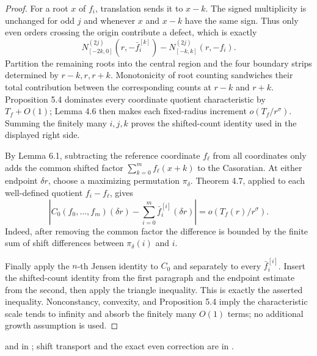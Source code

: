 \begin{proof}
\leanok
For a root $x$ of $f_i$, translation sends it to $x-k$.  The signed
multiplicity is unchanged for odd $j$ and whenever $x$ and $x-k$ have the
same sign.  Thus only even orders crossing the origin contribute a defect,
which is exactly
\[
 N_{[-2k,0]}^{(2j)}(r,-\bar f_i^{[k]})
 -N_{[-k,k]}^{(2j)}(r,-f_i).
\]
Partition the remaining roots into the central region and the four boundary
strips determined by $r-k,r,r+k$.  Monotonicity of root counting sandwiches
their total contribution between the corresponding counts at $r-k$ and
$r+k$.  Proposition 5.4 dominates every coordinate quotient characteristic
by $T_f+O(1)$; Lemma 4.6 then makes each fixed-radius increment
$o(T_f/r^\sigma)$.  Summing the finitely many $i,j,k$ proves the shifted-count
identity used in the displayed right side.

By Lemma 6.1, subtracting the reference coordinate $f_\ell$ from all
coordinates only adds the common shifted factor
$\sum_{k=0}^m f_\ell(x+k)$ to the Casoratian.  At either endpoint $\delta r$,
choose a maximizing permutation $\pi_\delta$.  Theorem 4.7, applied to each
well-defined quotient $f_i-f_\ell$, gives
\[
 \left|C_0(f_0,\ldots,f_m)(\delta r)
       -\sum_{i=0}^m\bar f_i^{[i]}(\delta r)\right|
 =o(T_f(r)/r^\sigma).
\]
Indeed, after removing the common factor the difference is bounded by the
finite sum of shift differences between $\pi_\delta(i)$ and $i$.

Finally apply the $n$-th Jensen identity to $C_0$ and separately to every
$\bar f_i^{[i]}$.  Insert the shifted-count identity from the first paragraph
and the endpoint estimate from the second, then apply the triangle inequality.
This is exactly the asserted inequality.  Nonconstancy, convexity, and
Proposition 5.4 imply the characteristic scale tends to infinity and absorb
the finitely many $O(1)$ terms; no additional growth assumption is used.
\end{proof}

\begin{leanproof}
 and
 in
; shift transport and the exact even correction are
in .
\end{leanproof}

